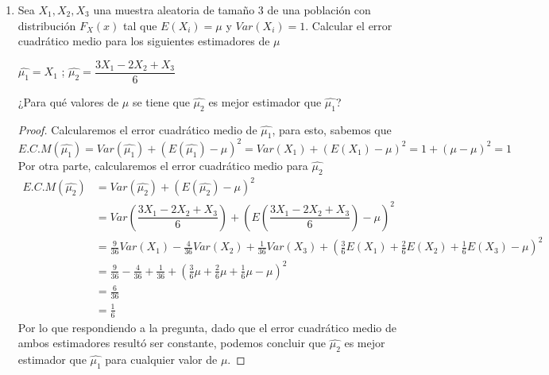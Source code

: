 \documentclass[10pt,a4paper]{article}
\theoremstyle{plain}
\theoremstyle{definition}
\theoremstyle{remark}
\newenvironment{solucion}{\renewcommand{\proofname}{Solución}\renewcommand{\qedsymbol}{}\begin{proof}}{\end{proof}}
\begin{document}
\begin{enumerate}
    \item Sea $X_1 , X_2 , X_3$ una muestra aleatoria de tamaño 3 de una población con distribución $F_X (x)$ tal que $E(X_i) = \mu$ y $Var(X_i) = 1$. Calcular el error cuadrático medio para los siguientes estimadores de $\mu$ 
    \begin{center}
        $\hat{\mu_1} = X_1$ \qquad ; \qquad $\hat{\mu_2} = \dfrac{3X_1 - 2X_2 + X_3}{6}$
    \end{center}
    ¿Para qué valores de $\mu$ se tiene que $\hat{\mu_2}$ es mejor estimador que $\hat{\mu_1}$?
    \begin{solucion}
    Calcularemos el error cuadrático medio de $\hat{\mu_1}$, para esto, sabemos que
    \begin{equation*}
        E.C.M(\hat{\mu_1}) = Var(\hat{\mu_1}) + (E(\hat{\mu_1})-\mu)^{2} = Var(X_1) + (E(X_1)-\mu)^2 = 1 + (\mu - \mu)^2 = 1
    \end{equation*}
    Por otra parte, calcularemos el error cuadrático medio para $\hat{\mu_2}$
\begin{equation*}
    \begin{split}
        E.C.M (\hat{\mu_2}) & = Var(\hat{\mu_2}) + (E(\hat{\mu_2})-\mu)^{2}\\
        & = Var\left( \dfrac{3X_1 - 2X_2 + X_3}{6} \right) + \left( E\left( \dfrac{3X_1 - 2X_2 + X_3}{6} \right) - \mu \right)^2\\
        & = \frac{9}{36}Var(X_1) - \frac{4}{36}Var(X_2) + \frac{1}{36}Var(X_3) + \left(\frac{3}{6}E(X_1) + \frac{2}{6} E(X_2) + \frac{1}{6}E(X_3) - \mu \right)^2\\
        & = \frac{9}{36} - \frac{4}{36} + \frac{1}{36} + \left( \frac{3}{6}\mu + \frac{2}{6}\mu + \frac{1}{6}\mu - \mu  \right)^2\\
        & = \frac{6}{36} \\
        & = \frac{1}{6}
    \end{split}
\end{equation*}
Por lo que respondiendo a la pregunta, dado que el error cuadrático medio de ambos estimadores resultó ser constante, podemos concluir que $\hat{\mu_2}$ es mejor estimador que $\hat{\mu_1}$ para cualquier valor de $\mu$.
    \end{solucion}
    

\end{enumerate}
\end{document}
